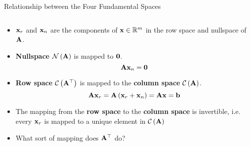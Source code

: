 \documentclass[aspectratio=169]{beamer}
\let\olditem\item
\renewcommand{\item}{\setlength{\itemsep}{\fill}\olditem}
\def\mf{\ensuremath\mathbf}
\def\mb{\ensuremath\mathbb}
\def\mc{\ensuremath\mathcal}
\def\lp{\ensuremath\left(}
\def\rp{\ensuremath\right)}
\begin{document}
\begin{frame}[t]{Relationship between the Four Fundamental Spaces}
\begin{columns}
\begin{column}{0.4\textwidth}
\begin{footnotesize}
\begin{itemize}
    \item $\mf{x}_r$ and $\mf{x}_n$ are the components of $\mf{x} \in \mb{R}^m$ in the row space and nullspace of $\mf{A}$.
    \item \textbf{Nullspace} $\mc{N}\lp\mf{A}\rp$ is mapped to $\mf{0}$.
    \[ \mf{A}\mf{x}_n = \mf{0} \]
    \item \textbf{Row space} $\mc{C}\lp\mf{A}^\top\rp$ is mapped to the \textbf{column space} $\mc{C}\lp\mf{A}\rp$.
    \[ \mf{A}\mf{x}_r = \mf{A}\lp\mf{x}_r + \mf{x}_n\rp = \mf{Ax} = \mf{b} \]
    \item The mapping from the \textbf{row space} to the \textbf{column space} is invertible, i.e. every $\mf{x}_r$ is mapped to a unique element in $\mc{C}\lp\mf{A}\rp$
    \item What sort of mapping does $\mf{A}^\top$ do?
\end{itemize}
\end{footnotesize}
\end{column}
\end{columns}
\end{frame}
\end{document}

